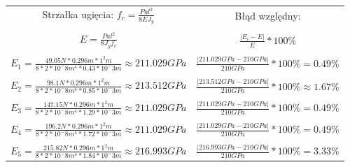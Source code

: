 \documentclass[11pt]{article}
\begin{document}
\begin{tabular}{cc}
Strzałka ugięcia: $f_c = \frac{Pal^2}{8EJ_y}$ & Błąd względny:\\\\
$E = \frac{Pal^2}{8J_yf_c}$ & $\frac{|E_i - E|}{E} * 100\%$\\\\
$E_1 = \frac{49.05 N * 0.296 m * 1^2 m}{8 * 2 * 10^-8 m^4 * 0.43 * 10^-3 m} \approx 211.029 GPa$ & $\frac{|211.029 GPa - 210 GPa|}{210 GPa} * 100\% = 0.49\%$\\\\
$E_2 = \frac{98.1 N * 0.296 m * 1^2 m}{8 * 2 * 10^-8 m^4 * 0.85 * 10^-3 m} \approx 213.512 GPa$ & $\frac{|213.512 GPa - 210 GPa|}{210 GPa} * 100\% \approx 1.67\%$\\\\
$E_3 = \frac{147.15 N * 0.296 m * 1^2 m}{8 * 2 * 10^-8 m^4 * 1.29 * 10^-3 m} \approx 211.029 GPa$ & $\frac{|211.029 GPa - 210 GPa|}{210 GPa} * 100\% = 0.49\%$\\\\
$E_4 = \frac{196.2 N * 0.296 m * 1^2 m}{8 * 2 * 10^-8 m^4 * 1.72 * 10^-3 m} \approx 211.029 GPa$ & $\frac{|211.029 GPa - 210 GPa|}{210 GPa} * 100\% = 0.49\%$\\\\
$E_5 = \frac{215.82 N * 0.296 m * 1^2 m}{8 * 2 * 10^-8 m^4 * 1.84 * 10^-3 m} \approx 216.993 GPa$ & $\frac{|216.993 GPa - 210 GPa|}{210 GPa} * 100\% = 3.33\%$\\
\end{tabular}
\\\\\\
\end{document}
